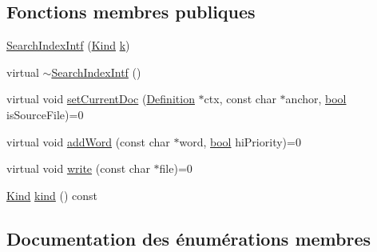 \subsection*{Fonctions membres publiques}
\begin{DoxyCompactItemize}
\item 
\hyperlink{class_search_index_intf_acf0114aef9108626eacc8c3fa065a46d}{Search\+Index\+Intf} (\hyperlink{class_search_index_intf_ade3dd4c1f8bc6487f0f3dccba5c6f9ea}{Kind} \hyperlink{060__command__switch_8tcl_a20363f854eb4098a446733d63d34dbc1}{k})
\item 
virtual \hyperlink{class_search_index_intf_a02fd1bf25d2f9f7d5ff12fcee678be80}{$\sim$\+Search\+Index\+Intf} ()
\item 
virtual void \hyperlink{class_search_index_intf_afb1f4d8ad5e2f24848f902ae82e38d31}{set\+Current\+Doc} (\hyperlink{class_definition}{Definition} $\ast$ctx, const char $\ast$anchor, \hyperlink{qglobal_8h_a1062901a7428fdd9c7f180f5e01ea056}{bool} is\+Source\+File)=0
\item 
virtual void \hyperlink{class_search_index_intf_abc2c1e940b5b534bbcec2b8a2356a7be}{add\+Word} (const char $\ast$word, \hyperlink{qglobal_8h_a1062901a7428fdd9c7f180f5e01ea056}{bool} hi\+Priority)=0
\item 
virtual void \hyperlink{class_search_index_intf_a58f5360b72b2379373e3efd001b7287a}{write} (const char $\ast$file)=0
\item 
\hyperlink{class_search_index_intf_ade3dd4c1f8bc6487f0f3dccba5c6f9ea}{Kind} \hyperlink{class_search_index_intf_a7cd92ca2c1615831b8880c63b8800030}{kind} () const 
\end{DoxyCompactItemize}


\subsection{Documentation des énumérations membres}
\hypertarget{class_search_index_intf_ade3dd4c1f8bc6487f0f3dccba5c6f9ea}{}
